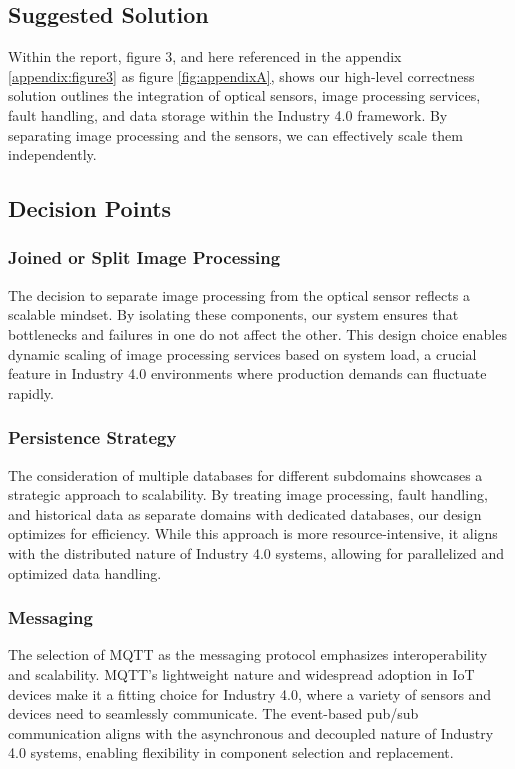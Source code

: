\documentclass[conference]{IEEEtran}
\begin{document}
\subsection{Suggested Solution}
Within the report, figure 3, and here referenced in the appendix \ref{appendix:figure3} as figure \ref{fig:appendixA}, shows our high-level correctness solution outlines the integration of optical sensors, image processing services, fault handling, and data storage within the Industry 4.0 framework. By separating image processing and the sensors, we can effectively scale them independently.

\subsection{Decision Points}
\subsubsection{Joined or Split Image Processing}
The decision to separate image processing from the optical sensor reflects a scalable mindset. By isolating these components, our system ensures that bottlenecks and failures in one do not affect the other\cite{Theorin2017-nq}. This design choice enables dynamic scaling of image processing services based on system load, a crucial feature in Industry 4.0 environments where production demands can fluctuate rapidly\cite{Alejandro2019-nq}.

\subsubsection{Persistence Strategy}
The consideration of multiple databases for different subdomains showcases a strategic approach to scalability. By treating image processing, fault handling, and historical data as separate domains with dedicated databases, our design optimizes for efficiency. While this approach is more resource-intensive, it aligns with the distributed nature of Industry 4.0 systems, allowing for parallelized and optimized data handling.

\subsubsection{Messaging}
The selection of MQTT as the messaging protocol emphasizes interoperability and scalability. MQTT's lightweight nature and widespread adoption in IoT devices make it a fitting choice for Industry 4.0, where a variety of sensors and devices need to seamlessly communicate. The event-based pub/sub communication aligns with the asynchronous and decoupled nature of Industry 4.0 systems, enabling flexibility in component selection and replacement\cite{Theorin2017-nq}.
\end{document}
